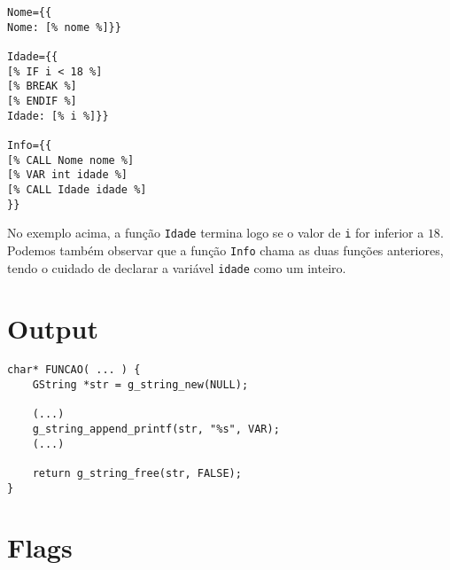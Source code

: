  \noindent
\begin{minipage}{\textwidth}
\begin{lstlisting}
Nome={{
Nome: [% nome %]}}

Idade={{
[% IF i < 18 %]
[% BREAK %]
[% ENDIF %]
Idade: [% i %]}}

Info={{
[% CALL Nome nome %]
[% VAR int idade %]
[% CALL Idade idade %]
}}
\end{lstlisting}
\end{minipage}

No exemplo acima, a função \texttt{Idade} termina logo se o valor de \texttt{i} for inferior a $18$. Podemos também observar que a função \texttt{Info} chama as duas funções anteriores, tendo o cuidado de declarar a variável \texttt{idade} como um inteiro.

\section{Output}

\begin{lstlisting}
char* FUNCAO( ... ) {
	GString *str = g_string_new(NULL);
	
	(...)
	g_string_append_printf(str, "%s", VAR);
	(...)
	
	return g_string_free(str, FALSE);
}
\end{lstlisting}

\section{Flags}
